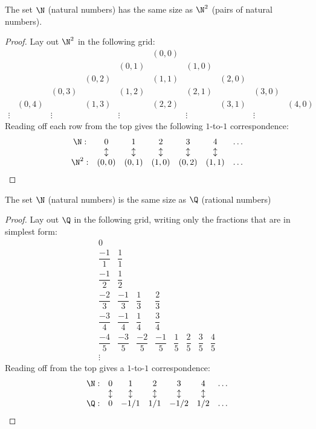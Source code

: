 \documentclass{scrbook}
\begin{document}
\begin{theorem}
  The set $\N$ (natural numbers) has the same size as $\N^2$ (pairs of natural numbers). 
\end{theorem}
\begin{proof}
  Lay out $\N^2$ in the following grid: 
  \[
  \begin{matrix}
    &&&&& (0,0)  \\
    &&&&(0,1)& & (1,0) \\
    &&&(0,2) && (1,1) && (2,0)  \\
    &&(0,3) && (1,2) && (2,1)&& (3,0) \\
    &(0,4) && (1,3) && (2,2) && (3,1) && (4,0) \\
    \vdots && \vdots && \vdots && \vdots && \vdots  
  \end{matrix}
  \]
  Reading off each row from the top gives the following $1$-to-$1$ correspondence:
  \[
  \begin{matrix}
    \N:& 0 & 1 & 2 & 3 & 4 & \dots \\
       & \updownarrow & \updownarrow& \updownarrow&\updownarrow&\updownarrow & \\
    \N^2:& (0,0) & (0,1) & (1,0) & (0,2) & (1,1) & \dots 
  \end{matrix}
  \]
\end{proof}

\begin{theorem}
  The set $\N$ (natural numbers) is the same size as $\Q$ (rational numbers)\label{th:q-countable}
\end{theorem}
\begin{proof}
  Lay out $\Q$ in the following grid, writing only the fractions that are in simplest form: 
  \begingroup
  \renewcommand*{\arraystretch}{2.2}
  \[
  \begin{matrix}
    0 \\
    \dfrac{-1}{1} & \dfrac 11\\
    \dfrac{-1}{2} & \dfrac{1}{2}\\
    \dfrac{-2}{3} & \dfrac{-1}3 & \dfrac 1 3 & \dfrac 2 3 \\
    \dfrac{-3}4 & \dfrac{-1}4 & \dfrac 1 4 & \dfrac 3 4 \\
    \dfrac{-4}5 & \dfrac {-3}5 & \dfrac {-2}5 & \dfrac {-1}5 & \dfrac 15 &\dfrac 25& \dfrac 35& \dfrac 45 \\
    \vdots 
  \end{matrix}
  \]
  \endgroup
  Reading off from the top gives a $1$-to-$1$ correspondence: 
  \[
  \begin{matrix}
    \N:& 0 & 1 & 2 & 3 & 4 & \dots \\
       & \updownarrow & \updownarrow& \updownarrow&\updownarrow&\updownarrow & \\
    \Q:& 0 & -1/1 & 1/1 & -1/2& 1/2 & \dots 
  \end{matrix}
  \]
\end{proof}
\end{document}
